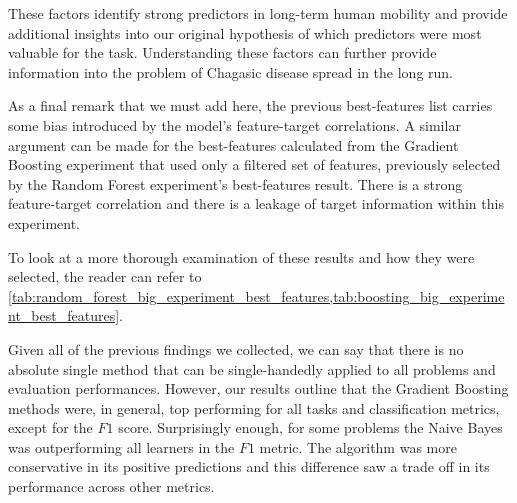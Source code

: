 These factors identify strong predictors in long-term human mobility and provide additional insights into our original hypothesis of which predictors were most valuable for the task.
Understanding these factors can further provide information into the problem of Chagasic disease spread in the long run.

As a final remark that we must add here, the previous best-features list carries some bias introduced by the model's feature-target correlations.
A similar argument can be made for the best-features calculated from the Gradient Boosting experiment that used only a filtered set of features, previously selected by the Random Forest experiment's best-features result.
There is a strong feature-target correlation and there is a leakage of target information within this experiment.

To look at a more thorough examination of these results and how they were selected, the reader can refer to \cref{tab:random_forest_big_experiment_best_features,tab:boosting_big_experiment_best_features}.





Given all of the previous findings we collected, we can say that there is no absolute single method that can be single-handedly applied to all problems and evaluation performances.
However, our results outline that the Gradient Boosting methods were, in general, top performing for all tasks and classification metrics, except for the $F1$ score.
Surprisingly enough, for some problems the Naive Bayes was outperforming all learners in the $F1$ metric.
The algorithm was more conservative in its positive predictions and this difference saw a trade off in its performance across other metrics.

